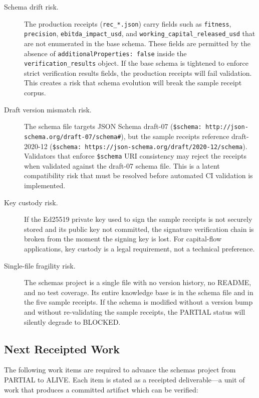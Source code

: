 \begin{description}
  \item[Schema drift risk.] The production receipts (\texttt{rec\_*.json}) carry fields such as
    \texttt{fitness}, \texttt{precision}, \texttt{ebitda\_impact\_usd}, and
    \texttt{working\_capital\_released\_usd} that are not enumerated in the base schema. These
    fields are permitted by the absence of \texttt{additionalProperties: false} inside the
    \texttt{verification\_results} object. If the base schema is tightened to enforce strict
    verification results fields, the production receipts will fail validation. This creates a
    risk that schema evolution will break the sample receipt corpus.
  \item[Draft version mismatch risk.] The schema file targets JSON Schema draft-07
    (\texttt{\$schema: http://json-schema.org/draft-07/schema\#}), but the sample receipts
    reference draft-2020-12 (\texttt{\$schema: https://json-schema.org/draft/2020-12/schema}).
    Validators that enforce \texttt{\$schema} URI consistency may reject the receipts when
    validated against the draft-07 schema file. This is a latent compatibility risk that must
    be resolved before automated CI validation is implemented.
  \item[Key custody risk.] If the Ed25519 private key used to sign the sample receipts is not
    securely stored and its public key not committed, the signature verification chain is broken
    from the moment the signing key is lost. For capital-flow applications, key custody is a
    legal requirement, not a technical preference.
  \item[Single-file fragility risk.] The schemas project is a single file with no version
    history, no README, and no test coverage. Its entire knowledge base is in the schema file
    and in the five sample receipts. If the schema is modified without a version bump and without
    re-validating the sample receipts, the PARTIAL status will silently degrade to BLOCKED.
\end{description}

\subsection{Next Receipted Work}
\label{sec:schemas-open-questions-next}

The following work items are required to advance the schemas project from PARTIAL to ALIVE.
Each item is stated as a receipted deliverable---a unit of work that produces a committed artifact
which can be verified:

